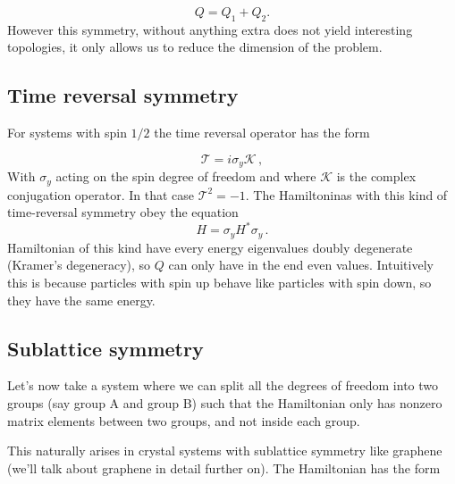 \[
Q=Q_1+Q_2.
\]
However this symmetry, without anything extra does not yield interesting topologies, it only allows us to reduce the dimension of the problem.

\subsection*{Time reversal symmetry}
For systems with spin $1/2$ the time reversal operator has the form \cite{tong2017quantum2}

\begin{equation}
    \mathcal T=i\sigma_y\mathcal K\,,
\end{equation}
With $\sigma_y$ acting on the spin degree of freedom and where $\mathcal K$ is the complex conjugation operator. In that case $\mathcal T^2=-1$.
The Hamiltoninas with this kind of time-reversal symmetry obey the equation 
\begin{equation}
    H=\sigma_y H^* \sigma_y\,.
\end{equation}
Hamiltonian of this kind have every energy eigenvalues doubly degenerate (Kramer's degeneracy), so $Q$ can only have in the end even values. Intuitively this is because particles with spin up behave like particles with spin down, so they have the same energy.

\subsection*{Sublattice symmetry}
    Let’s now take a system where we can split all the degrees of freedom into two groups (say group A and group B) such that the Hamiltonian only has nonzero matrix elements between two groups, and not inside each group.
    
    This naturally arises in crystal systems with sublattice symmetry like graphene (we'll talk about graphene in detail further on). The Hamiltonian has the form
    
